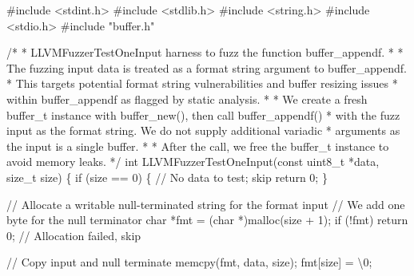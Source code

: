 \documentclass[
  a4paper,
]{scrreprt}
\newenvironment{Shaded}{\begin{snugshade}}{\end{snugshade}}
\newcommand{\CharTok}[1]{\textcolor[rgb]{0.00,0.50,0.00}{#1}}
\newcommand{\CommentTok}[1]{\textcolor[rgb]{0.41,0.41,0.41}{#1}}
\newcommand{\ControlFlowTok}[1]{\textcolor[rgb]{0.85,0.12,0.09}{#1}}
\newcommand{\DataTypeTok}[1]{\textcolor[rgb]{0.47,0.16,0.63}{#1}}
\newcommand{\DecValTok}[1]{\textcolor[rgb]{0.47,0.16,0.63}{#1}}
\newcommand{\ImportTok}[1]{\textcolor[rgb]{0.33,0.33,0.33}{#1}}
\newcommand{\NormalTok}[1]{\textcolor[rgb]{0.33,0.33,0.33}{#1}}
\newcommand{\OperatorTok}[1]{\textcolor[rgb]{0.00,0.46,0.62}{#1}}
\newcommand{\PreprocessorTok}[1]{\textcolor[rgb]{0.47,0.16,0.63}{#1}}
\newcommand{\SpecialCharTok}[1]{\textcolor[rgb]{0.00,0.46,0.62}{#1}}
\theoremstyle{definition}
\theoremstyle{remark}
\begin{document}
\begin{Shaded}
\begin{Highlighting}[numbers=left,,]
\PreprocessorTok{\#include }\ImportTok{\textless{}stdint.h\textgreater{}}
\PreprocessorTok{\#include }\ImportTok{\textless{}stdlib.h\textgreater{}}
\PreprocessorTok{\#include }\ImportTok{\textless{}string.h\textgreater{}}
\PreprocessorTok{\#include }\ImportTok{\textless{}stdio.h\textgreater{}}
\PreprocessorTok{\#include }\ImportTok{"buffer.h"}

\CommentTok{/*}
\CommentTok{ * LLVMFuzzerTestOneInput harness to fuzz the function buffer\_appendf.}
\CommentTok{ *}
\CommentTok{ * The fuzzing input data is treated as a format string argument to buffer\_appendf.}
\CommentTok{ * This targets potential format string vulnerabilities and buffer resizing issues}
\CommentTok{ * within buffer\_appendf as flagged by static analysis.}
\CommentTok{ *}
\CommentTok{ * We create a fresh buffer\_t instance with buffer\_new(), then call buffer\_appendf()}
\CommentTok{ * with the fuzz input as the format string. We do not supply additional variadic}
\CommentTok{ * arguments as the input is a single buffer.}
\CommentTok{ *}
\CommentTok{ * After the call, we free the buffer\_t instance to avoid memory leaks.}
\CommentTok{ */}
\DataTypeTok{int}\NormalTok{ LLVMFuzzerTestOneInput}\OperatorTok{(}\DataTypeTok{const} \DataTypeTok{uint8\_t} \OperatorTok{*}\NormalTok{data}\OperatorTok{,} \DataTypeTok{size\_t}\NormalTok{ size}\OperatorTok{)} \OperatorTok{\{}
    \ControlFlowTok{if} \OperatorTok{(}\NormalTok{size }\OperatorTok{==} \DecValTok{0}\OperatorTok{)} \OperatorTok{\{}
        \CommentTok{// No data to test; skip}
        \ControlFlowTok{return} \DecValTok{0}\OperatorTok{;}
    \OperatorTok{\}}

    \CommentTok{// Allocate a writable null{-}terminated string for the format input}
    \CommentTok{// We add one byte for the null terminator}
    \DataTypeTok{char} \OperatorTok{*}\NormalTok{fmt }\OperatorTok{=} \OperatorTok{(}\DataTypeTok{char} \OperatorTok{*)}\NormalTok{malloc}\OperatorTok{(}\NormalTok{size }\OperatorTok{+} \DecValTok{1}\OperatorTok{);}
    \ControlFlowTok{if} \OperatorTok{(!}\NormalTok{fmt}\OperatorTok{)} \ControlFlowTok{return} \DecValTok{0}\OperatorTok{;} \CommentTok{// Allocation failed, skip}

    \CommentTok{// Copy input and null terminate}
\NormalTok{    memcpy}\OperatorTok{(}\NormalTok{fmt}\OperatorTok{,}\NormalTok{ data}\OperatorTok{,}\NormalTok{ size}\OperatorTok{);}
\NormalTok{    fmt}\OperatorTok{[}\NormalTok{size}\OperatorTok{]} \OperatorTok{=} \CharTok{\textquotesingle{}}\SpecialCharTok{\textbackslash{}0}\CharTok{\textquotesingle{}}\OperatorTok{;}


\end{Highlighting}
\end{Shaded}
\end{document}
